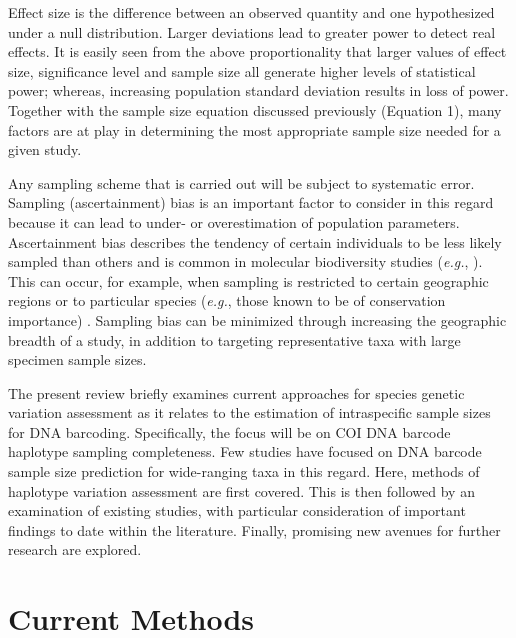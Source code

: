 \noindent Effect size is the difference between an observed quantity and one hypothesized under a null distribution. Larger deviations lead to greater power to detect real effects. It is easily seen from the above proportionality that larger values of effect size, significance level and sample size all generate higher levels of statistical power; whereas, increasing population standard deviation results in loss of power. Together with the sample size equation discussed previously (Equation 1), many factors are at play in determining the most appropriate sample size needed for a given study.



Any sampling scheme that is carried out will be subject to systematic error. Sampling (ascertainment) bias is an important factor to consider in this regard because it can lead to under- or overestimation of population parameters. Ascertainment bias describes the tendency of certain individuals to be less likely sampled than others \cite{parr2012evolutionary} and is common in molecular biodiversity studies (\textit{e.g.}, \cite{hanner2011fish, muirhead2008identifying, mutanen2016species, wilkinson2017replacing}). This can occur, for example, when sampling is restricted to certain geographic regions \cite{muirhead2008identifying} or to particular species (\textit{e.g.}, those known to be of conservation importance) \cite{hanner2011fish}. Sampling bias can be minimized through increasing the geographic breadth of a study, in addition to targeting representative taxa with large specimen sample sizes.



The present review briefly examines current approaches for species genetic variation assessment as it relates to the estimation of intraspecific sample sizes for DNA barcoding. Specifically, the focus will be on COI DNA barcode haplotype sampling completeness. Few studies have focused on DNA barcode sample size prediction for wide-ranging taxa in this regard. Here, methods of haplotype variation assessment are first covered. This is then followed by an examination of existing studies, with particular consideration of important findings to date within the literature. Finally, promising new avenues for further research are explored.



\section{Current Methods}

